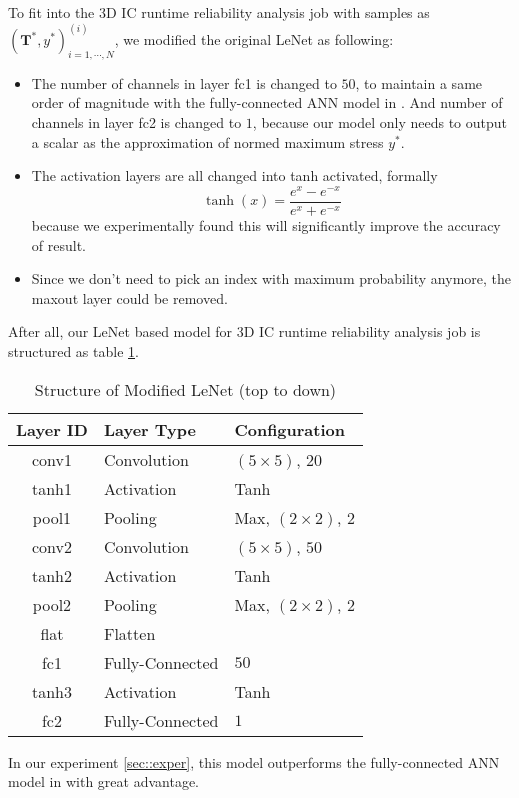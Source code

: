 To fit into the 3D IC runtime reliability analysis job with samples as 
$\left(\mathbf{T}^*, y^*\right)^{(i)}_{i=1,\cdots, N}$,
we modified the original LeNet as following:
\begin{itemize}
    \item The number of channels in layer fc1 is changed to $50$, to maintain a same order of magnitude
    with the fully-connected ANN model in \cite{Zhang2016Fast}. 
    And number of channels in layer fc2 is changed to $1$, because our model
    only needs to output a scalar as the approximation of normed maximum stress $y ^ *$.
    \item The activation layers are all changed into tanh activated, formally
    \begin{equation}
    \tanh (x) = \frac{e^x - e^{-x}}{e^x + e^{-x}}
    \end{equation}
    because we experimentally found this will significantly improve the accuracy of result.
    \item Since we don't need to pick an index with maximum probability anymore, the maxout
    layer could be removed.
\end{itemize}
After all, our LeNet based model for 3D IC runtime reliability analysis job is structured as table \ref{tab::LeNet'}.
\begin{table}[htb]
    \centering
    \begin{tabular}{cll}
        \toprule
        Layer ID & Layer Type & Configuration \\
        \midrule
        conv1 & Convolution & $\left(5\times5\right)$, $20$ \\
        tanh1  & Activation  & Tanh \\
        pool1 & Pooling     & Max, $\left(2\times2\right)$, $2$ \\
        conv2 & Convolution & $\left(5\times5\right)$, $50$ \\
        tanh2  & Activation  & Tanh \\
        pool2 & Pooling     & Max, $\left(2\times2\right)$, $2$ \\
        flat  & Flatten     & \\
        fc1   & Fully-Connected & $50$ \\
        tanh3  & Activation  & Tanh \\
        fc2   & Fully-Connected & $1$ \\
        \bottomrule
    \end{tabular}
    \caption{Structure of Modified LeNet (top to down)}
    \label{tab::LeNet'}
\end{table}
In our experiment \ref{sec::exper}, this model outperforms the fully-connected ANN model in \cite{Zhang2016Fast}
with great advantage.

